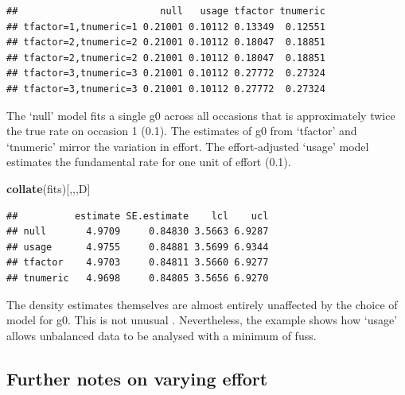 \documentclass[
]{book}
\newenvironment{Shaded}{\begin{snugshade}}{\end{snugshade}}
\newcommand{\FunctionTok}[1]{\textcolor[rgb]{0.13,0.29,0.53}{\textbf{#1}}}
\newcommand{\NormalTok}[1]{#1}
\newcommand{\StringTok}[1]{\textcolor[rgb]{0.31,0.60,0.02}{#1}}
\begin{document}
\begin{verbatim}
##                         null   usage tfactor tnumeric
## tfactor=1,tnumeric=1 0.21001 0.10112 0.13349  0.12551
## tfactor=2,tnumeric=2 0.21001 0.10112 0.18047  0.18851
## tfactor=2,tnumeric=2 0.21001 0.10112 0.18047  0.18851
## tfactor=3,tnumeric=3 0.21001 0.10112 0.27772  0.27324
## tfactor=3,tnumeric=3 0.21001 0.10112 0.27772  0.27324
\end{verbatim}

The `null' model fits a single g0 across all occasions that is approximately twice the true rate on occasion 1 (0.1). The estimates of g0 from `tfactor' and `tnumeric' mirror the variation in effort. The effort-adjusted `usage' model estimates the fundamental rate for one unit of effort (0.1).

\begin{Shaded}
\begin{Highlighting}[]
\FunctionTok{collate}\NormalTok{(fits)[,,,}\StringTok{\textquotesingle{}D\textquotesingle{}}\NormalTok{]}
\end{Highlighting}
\end{Shaded}

\begin{verbatim}
##          estimate SE.estimate    lcl    ucl
## null       4.9709     0.84830 3.5663 6.9287
## usage      4.9755     0.84881 3.5699 6.9344
## tfactor    4.9703     0.84811 3.5660 6.9277
## tnumeric   4.9698     0.84805 3.5656 6.9270
\end{verbatim}

The density estimates themselves are almost entirely unaffected by the choice of model for g0. This is not unusual \citep{Sollmann2024}. Nevertheless, the example shows how `usage' allows unbalanced data to be analysed with a minimum of fuss.

\subsection{Further notes on varying effort}\label{further-notes-on-varying-effort}
\end{document}
